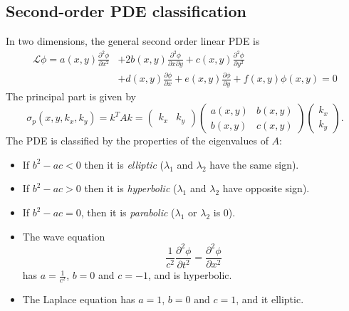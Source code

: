 \documentclass[12pt]{article}
\begin{document}
\subsection{Second-order PDE classification}%
\label{sub:second_order_pde_classification}

In two dimensions, the general second order linear PDE is
\begin{align*}
	\mathcal{L} \phi = a(x, y) \frac{\partial^2 \phi}{\partial x^2} &+ 2 b(x, y) \frac{\partial^2 \phi}{\partial x \partial y} + c(x, y) \frac{\partial^2 \phi}{\partial y^2} \\
									     &+ d(x, y) \frac{\partial \phi}{\partial x} + e(x, y) \frac{\partial \phi}{\partial y} + f(x, y) \phi(x, y) = 0
\end{align*}
The principal part is given by
\[
	\sigma_p(x, y, k_x, k_y) = k^{T}Ak =
	\begin{pmatrix}
		k_x & k_y
	\end{pmatrix}
	\begin{pmatrix}
		a(x, y) & b(x, y) \\
		b(x, y) & c(x, y)
	\end{pmatrix}
	\begin{pmatrix}
		k_x \\
		k_y
	\end{pmatrix}
.\]
The PDE is classified by the properties of the eigenvalues of $A$:
\begin{itemize}
	\item If $b^2 - ac < 0$ then it is \textit{elliptic} ($\lambda_1$ and $\lambda_2$ have the same sign).
	\item If $b^2 - ac > 0$ then it is \textit{hyperbolic} ($\lambda_1$ and $\lambda_2$ have opposite sign).
	\item If $b^2 - ac = 0$, then it is \textit{parabolic} ($\lambda_1$ or $\lambda_2$ is $0$).
\end{itemize}

\begin{exbox}
	\begin{itemize}
		\item The wave equation
			\[
			\frac{1}{c^2} \frac{\partial^2 \phi}{\partial t^2} = \frac{\partial^2 \phi}{\partial x^2}
			\]
			has $a = \frac{1}{c^2}$, $b = 0$ and $c = -1$, and is hyperbolic.
		\item The Laplace equation has $a = 1$, $b = 0$ and $c = 1$, and it elliptic.
	\end{itemize}
\end{exbox}
\end{document}
